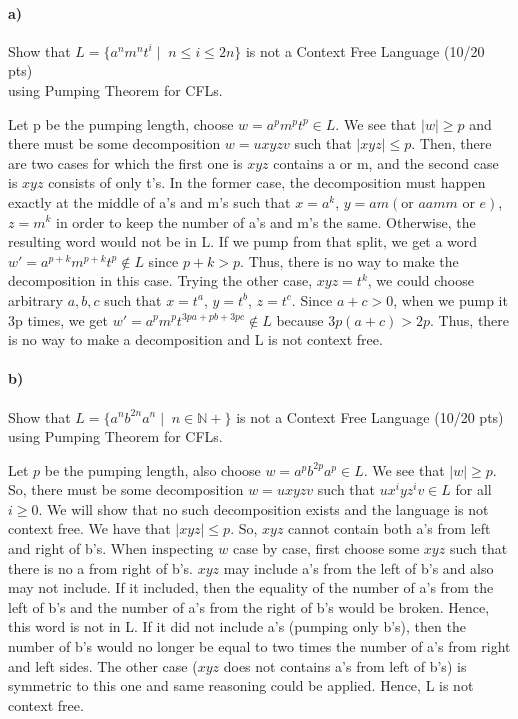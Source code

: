 \documentclass[a4paper,12pt]{article}
\begin{document}
\paragraph{a)} Show that $L=\{a^n m^n t^i \mid \; n\leq i \leq 2n\}$ is not a Context Free Language \hfill \small{(10/20 pts)} \\
using Pumping Theorem for CFLs. \\

\begin{tcolorbox}
Let p be the pumping length, choose $w=a^pm^pt^p\in L$. We see that $|w| \geq p$ and there must be some decomposition $w=uxyzv$ such that $|xyz| \leq p$. Then, there are two cases for which the first one is $xyz$ contains a or m, and the second case is $xyz$ consists of only t's. In the former case, the decomposition must happen exactly at the middle of a's and m's such that $x=a^k$, $y=am(\text{or }aamm\text{ or }e)$, $z=m^k$ in order to keep the number of a's and m's the same. Otherwise, the resulting word would not be in L. If we pump from that split, we get a word $w'=a^{p+k}m^{p+k}t^p\notin L$ since $p+k>p$. Thus, there is no way to make the decomposition in this case. Trying the other case, $xyz=t^k$, we could choose arbitrary $a,b,c$ such that $x=t^a$, $y=t^b$, $z=t^c$.  Since $a+c>0$, when we pump it 3p times, we get $w'=a^pm^pt^{3pa+pb+3pc}\notin L$ because $3p(a+c) > 2p$. Thus, there is no way to make a decomposition and L is not context free.
\end{tcolorbox}


\paragraph{b)} Show that $L=\{a^n b^{2n} a^n \mid \; n \in \mathbb{N+} \}$ is not a Context Free Language \hfill \small{(10/20 pts)} \\
using Pumping Theorem for CFLs. \\

\begin{tcolorbox}
Let $p$ be the pumping length, also choose $w=a^pb^{2p}a^p\in L$. We see that $|w| \geq p$. So, there must be some decomposition $w=uxyzv$ such that $ux^iyz^iv\in L$ for all $i \geq 0$. We will show that no such decomposition exists and the language is not context free. We have that $|xyz| \leq p$. So, $xyz$ cannot contain both a's from left and right of b's. When inspecting $w$ case by case, first choose some $xyz$ such that there is no a from right of b's. $xyz$ may include a's from the left of b's and also may not include. If it included, then the equality of the number of a's from the left of b's and the number of a's from the right of b's would be broken. Hence, this word is not in L. If it did not include a's (pumping only b's), then the number of b's would no longer be equal to two times the number of a's from right and left sides. The other case ($xyz$ does not contains a's from left of b's) is symmetric to this one and same reasoning could be applied. Hence, L is not context free.
\end{tcolorbox}
\end{document}
